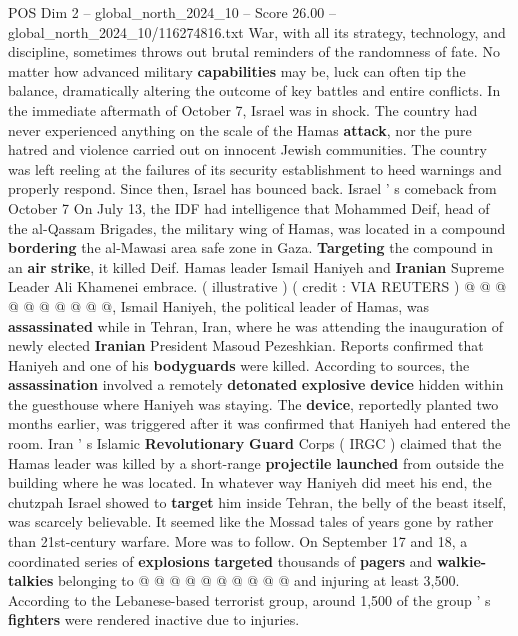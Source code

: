 \begin{textsample}{POS Dim 2 – global\_north\_2024\_10 – Score 26.00 – global\_north\_2024\_10/116274816.txt}  \label{ex:f2_pos_079}
War, with all its strategy, technology, and discipline, sometimes throws out brutal reminders of the randomness of fate.
No matter how advanced military \textbf{capabilities} may be, luck can often tip the balance, dramatically altering the outcome of key battles and entire conflicts.
In the immediate aftermath of October 7, Israel was in shock.
The country had never experienced anything on the scale of the Hamas \textbf{attack}, nor the pure hatred and violence carried out on innocent Jewish communities.
The country was left reeling at the failures of its security establishment to heed warnings and properly respond.
Since then, Israel has bounced back.
Israel ' s comeback from October 7 On July 13, the IDF had intelligence that Mohammed Deif, head of the al-Qassam Brigades, the military wing of Hamas, was located in a compound \textbf{bordering} the al-Mawasi area safe zone in Gaza. \textbf{Targeting} the compound in an \textbf{air} \textbf{strike}, it killed Deif.
Hamas leader Ismail Haniyeh and \textbf{Iranian} Supreme Leader Ali Khamenei embrace. ( illustrative ) ( credit : VIA REUTERS ) @ @ @ @ @ @ @ @ @ @, Ismail Haniyeh, the political leader of Hamas, was \textbf{assassinated} while in Tehran, Iran, where he was attending the inauguration of newly elected \textbf{Iranian} President Masoud Pezeshkian.
Reports confirmed that Haniyeh and one of his \textbf{bodyguards} were killed.
According to sources, the \textbf{assassination} involved a remotely \textbf{detonated} \textbf{explosive} \textbf{device} hidden within the guesthouse where Haniyeh was staying.
The \textbf{device}, reportedly planted two months earlier, was triggered after it was confirmed that Haniyeh had entered the room.
Iran ' s Islamic \textbf{Revolutionary} \textbf{Guard} Corps ( IRGC ) claimed that the Hamas leader was killed by a short-range \textbf{projectile} \textbf{launched} from outside the building where he was located.
In whatever way Haniyeh did meet his end, the chutzpah Israel showed to \textbf{target} him inside Tehran, the belly of the beast itself, was scarcely believable.
It seemed like the Mossad tales of years gone by rather than 21st-century warfare.
More was to follow.
On September 17 and 18, a coordinated series of \textbf{explosions} \textbf{targeted} thousands of \textbf{pagers} and \textbf{walkie-talkies} belonging to @ @ @ @ @ @ @ @ @ @ and injuring at least 3,500.
According to the Lebanese-based terrorist group, around 1,500 of the group ' s \textbf{fighters} were rendered inactive due to injuries.

\end{textsample}
